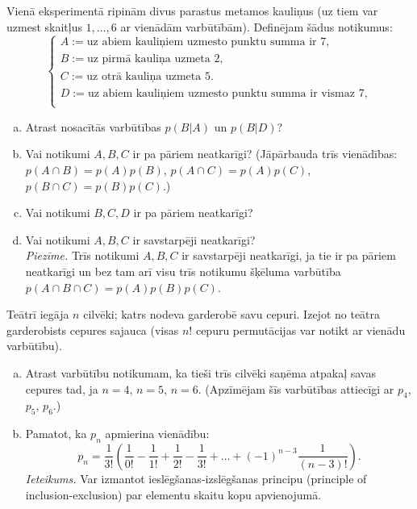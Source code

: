 \documentclass[a4paper,12pt]{article}
\begin{document}
\vspace{10pt}
\begin{problem}
Vienā eksperimentā ripinām divus parastus metamos kauliņus (uz tiem var uzmest skaitļus $1,\ldots,6$ ar vienādām varbūtībām). 
Definējam šādus notikumus: 
\[ \left\{ \begin{array}{l}
A := \text{uz abiem kauliņiem uzmesto punktu summa ir $7$},\\
B := \text{uz pirmā kauliņa uzmeta $2$},\\
C := \text{uz otrā kauliņa uzmeta $5$}.\\
D := \text{uz abiem kauliņiem uzmesto punktu summa ir vismaz $7$},\\
\end{array} \right. \]
\begin{enumerate}[(a)]
\item Atrast nosacītās varbūtības $p(B|A)$ un $p(B|D)$?
\item Vai notikumi $A,B,C$ ir pa pāriem neatkarīgi? (Jāpārbauda trīs vienādības: $p(A \cap B) = p(A)p(B)$, $p(A \cap C) = p(A)p(C)$, $p(B \cap C) = p(B)p(C)$.)
\item Vai notikumi $B,C,D$ ir pa pāriem neatkarīgi? 
\item Vai notikumi $A,B,C$ ir savstarpēji neatkarīgi?\\
{\em Piezīme.} Trīs notikumi $A,B,C$ ir savstarpēji neatkarīgi, ja tie ir pa pāriem neatkarīgi un 
bez tam arī visu trīs notikumu šķēluma varbūtība $p(A \cap B \cap C) = p(A)p(B)p(C)$.
\end{enumerate}
\end{problem}


\vspace{10pt}
\begin{problem}
Teātrī iegāja $n$ cilvēki; katrs nodeva garderobē savu cepuri. Izejot no teātra garderobists cepures sajauca (visas $n!$ cepuru permutācijas
var notikt ar vienādu varbūtību). 
\begin{enumerate}[(a)]
\item Atrast varbūtību notikumam, ka tieši trīs cilvēki saņēma atpakaļ savas cepures tad, ja $n=4$, $n=5$, $n=6$. 
(Apzīmējam šīs varbūtības attiecīgi ar $p_4$, $p_5$, $p_6$.)
\item 
Pamatot, ka $p_n$ apmierina vienādību: 
\[ p_n = \frac{1}{3!} \left( \frac{1}{0!} - \frac{1}{1!} + \frac{1}{2!} - \frac{1}{3!} + \ldots + (-1)^{n-3} \frac{1}{(n-3)!} \right). \]
{\em Ieteikums.} Var izmantot ieslēgšanas-izslēgšanas principu (principle of inclusion-exclusion) par elementu skaitu kopu apvienojumā.
\end{enumerate}
\end{problem}
\end{document}
